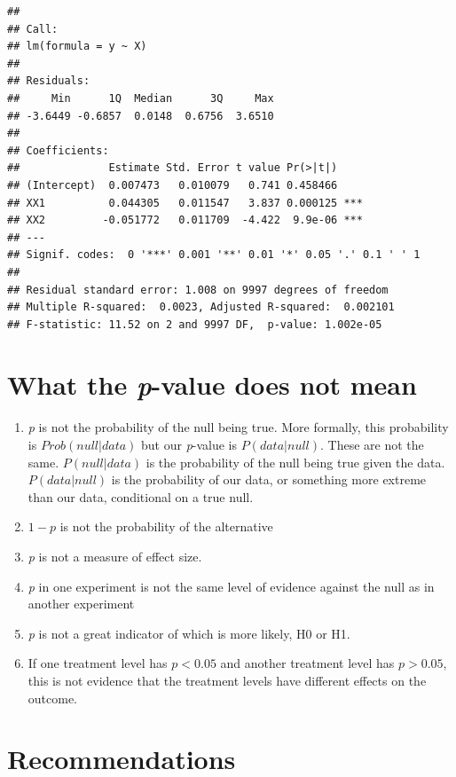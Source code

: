 \documentclass[]{book}
\providecommand{\tightlist}{%
  \setlength{\itemsep}{0pt}\setlength{\parskip}{0pt}}
\begin{document}
\begin{verbatim}
## 
## Call:
## lm(formula = y ~ X)
## 
## Residuals:
##     Min      1Q  Median      3Q     Max 
## -3.6449 -0.6857  0.0148  0.6756  3.6510 
## 
## Coefficients:
##              Estimate Std. Error t value Pr(>|t|)    
## (Intercept)  0.007473   0.010079   0.741 0.458466    
## XX1          0.044305   0.011547   3.837 0.000125 ***
## XX2         -0.051772   0.011709  -4.422  9.9e-06 ***
## ---
## Signif. codes:  0 '***' 0.001 '**' 0.01 '*' 0.05 '.' 0.1 ' ' 1
## 
## Residual standard error: 1.008 on 9997 degrees of freedom
## Multiple R-squared:  0.0023, Adjusted R-squared:  0.002101 
## F-statistic: 11.52 on 2 and 9997 DF,  p-value: 1.002e-05
\end{verbatim}

\hypertarget{what-the-p-value-does-not-mean}{%
\section{\texorpdfstring{What the \emph{p}-value does not mean}{What the p-value does not mean}}\label{what-the-p-value-does-not-mean}}

\begin{enumerate}
\def\labelenumi{\arabic{enumi}.}
\tightlist
\item
  \emph{p} is not the probability of the null being true. More formally, this probability is \(Prob(null | data)\) but our \emph{p}-value is \(P(data | null)\). These are not the same. \(P(null | data)\) is the probability of the null being true given the data. \(P(data | null)\) is the probability of our data, or something more extreme than our data, conditional on a true null.
\item
  \(1-p\) is not the probability of the alternative
\item
  \emph{p} is not a measure of effect size.
\item
  \emph{p} in one experiment is not the same level of evidence against the null as in another experiment
\item
  \emph{p} is not a great indicator of which is more likely, H0 or H1.
\item
  If one treatment level has \(p < 0.05\) and another treatment level has \(p > 0.05\), this is not evidence that the treatment levels have different effects on the outcome.
\end{enumerate}

\hypertarget{recommendations}{%
\section{Recommendations}\label{recommendations}}
\end{document}
